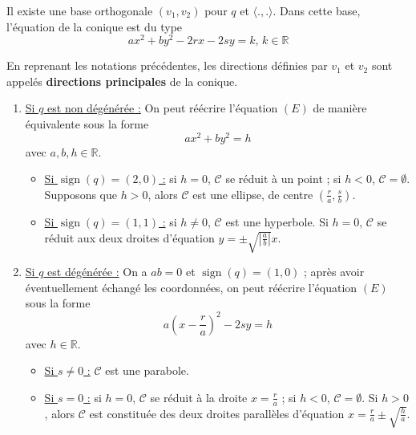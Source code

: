   \begin{proposition}
    Il existe une base orthogonale $(v_1, v_2)$ pour $q$ et $\langle ., . \rangle$. Dans cette base, l'équation de la conique est du type
    \[ ax^2 + by^2 - 2rx - 2sy = k, \, k \in \mathbb{R} \tag{$E$} \]
  \end{proposition}

  \begin{definition}
    En reprenant les notations précédentes, les directions définies par $v_1$ et $v_2$ sont appelés \textbf{directions principales} de la conique.
  \end{definition}

  \begin{theorem}
    \begin{enumerate}[label={\bfseries(\roman*)}]
      \item \uline{Si $q$ est non dégénérée :} On peut réécrire l'équation $(E)$ de manière équivalente sous la forme
      \[ ax^2 + by^2 = h \]
      avec $a, b, h \in \mathbb{R}$.
      \begin{itemize}
        \item \uline{Si $\operatorname{sign}(q) = (2,0)$ :} si $h = 0$, $\mathcal{C}$ se réduit à un point ; si $h < 0$, $\mathcal{C} = \emptyset$. Supposons que $h > 0$, alors $\mathcal{C}$ est une ellipse, de centre $\left( \frac{r}{a}, \frac{s}{b} \right)$.
        \item \uline{Si $\operatorname{sign}(q) = (1,1)$ :} si $h \neq 0$, $\mathcal{C}$ est une hyperbole. Si $h = 0$, $\mathcal{C}$ se réduit aux deux droites d'équation $y = \pm \sqrt{\left\vert \frac{a}{b} \right\vert}x$.
      \end{itemize}
      \item \uline{Si $q$ est dégénérée :} On a $ab = 0$ et $\operatorname{sign}(q) = (1,0)$ ; après avoir éventuellement échangé les coordonnées, on peut réécrire l'équation $(E)$ sous la forme
      \[ a \left( x - \frac{r}{a} \right)^2 - 2sy = h \]
      avec $h \in \mathbb{R}$.
      \begin{itemize}
        \item \uline{Si $s \neq 0$ :} $\mathcal{C}$ est une parabole.
        \item \uline{Si $s = 0$ :} si $h = 0$, $\mathcal{C}$ se réduit à la droite $x = \frac{r}{a}$ ; si $h < 0$, $\mathcal{C} = \emptyset$. Si $h > 0$, alors $\mathcal{C}$ est constituée des deux droites parallèles d'équation $x = \frac{r}{a} \pm \sqrt{\frac{h}{a}}$.
      \end{itemize}
    \end{enumerate}
  \end{theorem}


